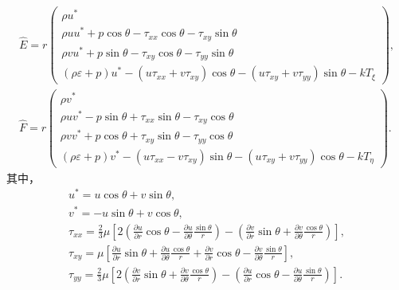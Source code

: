 \documentclass[12pt]{article}
\begin{document}
\begin{gather}
	\hat{E}=r \begin{pmatrix}
		\rho u^{*}                                                               \\
		\rho u u^{*}+p \cos \theta-\tau_{x x} \cos \theta-\tau_{x y} \sin \theta \\
		\rho v u^{*}+p \sin \theta-\tau_{x y} \cos \theta-\tau_{y y} \sin \theta \\
		(\rho \varepsilon+p) u^{*}-\left(u \tau_{x x}+v \tau_{x y}\right) \cos \theta-\left(u \tau_{x y}+v \tau_{y y}\right) \sin \theta-k T_{\xi}
	\end{pmatrix},\\
	\hat{F}=r\begin{pmatrix}
		\rho v^{*}                                                               \\
		\rho u v^{*}-p \sin \theta+\tau_{x x} \sin \theta-\tau_{x y} \cos \theta \\
		\rho v v^{*}+p \cos \theta+\tau_{x y} \sin \theta-\tau_{y y} \cos \theta \\
		(\rho \varepsilon+p) v^{*}-\left(u \tau_{x x}-v \tau_{x y}\right) \sin \theta-\left(u \tau_{x y}+v \tau_{y y}\right) \cos \theta-k T_{\eta}
	\end{pmatrix}.
\end{gather}
其中，
\begin{gather}
	u^{*}=u \cos \theta+v \sin \theta,                                                                                                                                                                                                                                       \\
	v^{*}=-u \sin \theta+v \cos \theta,                                                                                                                                                                                                                                      \\
	\tau_{x x}=\frac{2}{3} \mu\left[2\left(\frac{\partial u}{\partial r} \cos \theta-\frac{\partial u}{\partial \theta} \frac{\sin \theta}{r}\right)-\left(\frac{\partial v}{\partial r} \sin \theta+\frac{\partial v}{\partial \theta} \frac{\cos \theta}{r}\right)\right], \\
	\tau_{x y}=\mu\left[\frac{\partial u}{\partial r} \sin \theta+\frac{\partial u}{\partial \theta} \frac{\cos \theta}{r}+\frac{\partial v}{\partial r} \cos \theta-\frac{\partial v}{\partial \theta} \frac{\sin \theta}{r}\right],                                        \\
	\tau_{y y}=\frac{2}{3} \mu\left[2\left(\frac{\partial v}{\partial r} \sin \theta+\frac{\partial v}{\partial \theta} \frac{\cos \theta}{r}\right)-\left(\frac{\partial u}{\partial r} \cos \theta-\frac{\partial u}{\partial \theta} \frac{\sin \theta}{r}\right)\right].
\end{gather}
\end{document}
